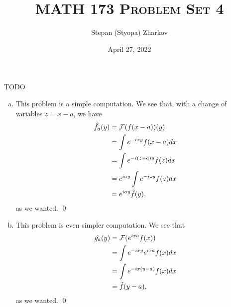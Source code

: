 \documentclass{article}
\title{\textsc{MATH 173 Problem Set 4}}
\author{Stepan (Styopa) Zharkov}
\date{April 27, 2022}
\begin{document}
\maketitle
{} TODO  \tri
\hop 
\solution
\begin{enumerate}[(a)]
    \item This problem is a simple computation. We see that, with a change of variables $z = x-a$, we have
    \begin{align*}
        \hat{f_a}(y) &= \cal{F}(f(x-a))(y) \\
        &= \int e^{-ixy}f(x-a)dx \\
        &= \int e^{-i(z+a)y}f(z)dx \\
        &= e^{iay}\int e^{-izy}f(z)dx \\
        &= e^{iay}\hat{f}(y),
    \end{align*}
    as we wanted. \qed
    \item This problem is even simpler computation. We see that 
    \begin{align*}
        \hat{g_a}(y) &= \cal{F}(e^{ixa}f(x))\\
        &= \int e^{-ixy}e^{ixa}f(x)dx \\
        &= \int e^{-ix(y-a)}f(x)dx \\
        &= \hat{f}(y-a),
    \end{align*}
    as we wanted. \qed
\end{enumerate}
\end{document}
